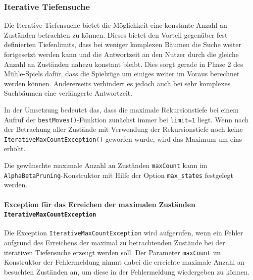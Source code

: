 \documentclass[11pt]{article}
\begin{document}
    \hypertarget{iterative-tiefensuche}{%
\subsubsection{Iterative Tiefensuche}\label{iterative-tiefensuche}}

Die Iterative Tiefensuche bietet die Möglichkeit eine konstante Anzahl
an Zuständen betrachten zu können. Dieses bietet den Vorteil gegenüber
fest definierten Tiefenlimits, dass bei weniger komplexen Bäumen die
Suche weiter fortgesetzt werden kann und die Antwortzeit an den Nutzer
durch die gleiche Anzahl an Zuständen nahezu konstant bleibt. Dies sorgt
gerade in Phase 2 des Mühle-Spiels dafür, dass die Spielzüge um einiges
weiter im Voraus berechnet werden können. Andererseits verhindert es
jedoch auch bei sehr komplexes Suchbäumen eine verlängerte Antwortzeit.

In der Umsetzung bedeutet das, dass die maximale Rekursionstiefe bei
einem Aufruf der \texttt{bestMoves()}-Funktion zunächst immer bei
\texttt{limit=1} liegt. Wenn nach der Betrachung aller Zustände mit
Verwendung der Rekursionstiefe noch keine
\texttt{IterativeMaxCountException()} geworfen wurde, wird das Maximum
um eins erhöht.

Die gewünschte maximale Anzahl an Zuständen \texttt{maxCount} kann im
\texttt{AlphaBetaPruning}-Konstruktor mit Hilfe der Option
\texttt{max\_states} festgelegt werden.

\hypertarget{exception-fuxfcr-das-erreichen-der-maximalen-zustuxe4nden-iterativemaxcountexception}{%
\paragraph{\texorpdfstring{Exception für das Erreichen der maximalen
Zuständen
\texttt{IterativeMaxCountException}}{Exception für das Erreichen der maximalen Zuständen IterativeMaxCountException}}\label{exception-fuxfcr-das-erreichen-der-maximalen-zustuxe4nden-iterativemaxcountexception}}

Die Exception \texttt{IterativeMaxCountException} wird aufgerufen, wenn
ein Fehler aufgrund des Erreichens der maximal zu betrachtenden Zustände
bei der iterativen Tiefensuche erzeugt werden soll. Der Parameter
\texttt{maxCount} im Konstruktor der Fehlermeldung nimmt dabei die
erreichte maximale Anzahl an besuchten Zuständen an, um diese in der
Fehlermeldung wiedergeben zu können.
\end{document}
